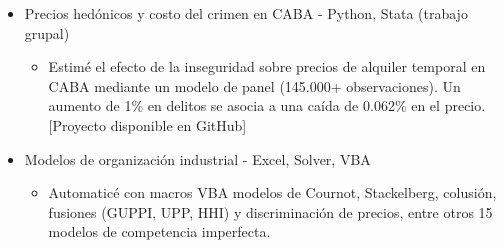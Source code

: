 \documentclass[11pt, a4paper]{article}
\begin{document}
\begin{itemize}[label=\small$\bullet$, leftmargin=1.4em, itemsep=5pt]
\color{darktext}
    \item {\large Precios hedónicos y costo del crimen en CABA - Python, Stata (trabajo grupal)}
     \begin{itemize}[label=\tiny$\bullet$]
        \item {\large \color{subtext} Estimé el efecto de la inseguridad sobre precios de alquiler temporal en CABA mediante un modelo de panel (145.000+ observaciones). Un aumento de 1\% en delitos se asocia a una caída de 0.062\% en el precio. {\color{linecolor} [Proyecto disponible en GitHub]}}
    \end{itemize}
    
    \item {\large Modelos de organización industrial - Excel, Solver, VBA}
     \begin{itemize}[label=\tiny$\bullet$]
        \item {\large \color{subtext} Automaticé con macros VBA modelos de Cournot, Stackelberg, colusión, fusiones (GUPPI, UPP, HHI) y discriminación de precios, entre otros 15 modelos de competencia imperfecta.}
    \end{itemize}
    
\end{itemize}
\end{document}
